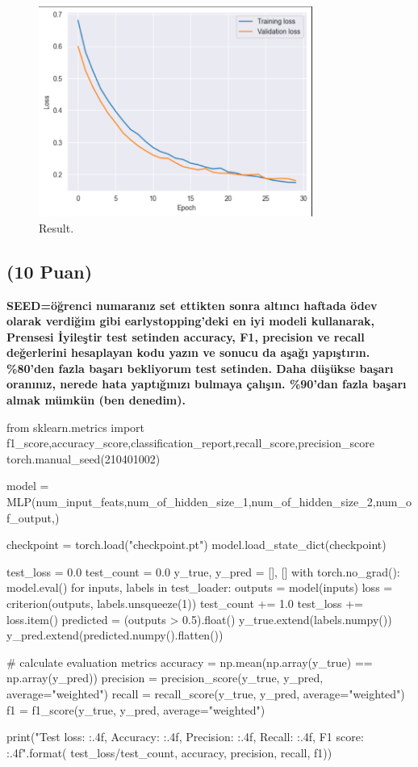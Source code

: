 \documentclass[11pt]{article}
\begin{document}
\begin{figure}[htbp]
  \centering
  \includegraphics[width=0.8\textwidth]{./result.png}
  \caption{Result.}
  \label{RESULT}
\end{figure}


\subsection{(10 Puan)} \textbf{SEED=öğrenci numaranız set ettikten sonra altıncı haftada ödev olarak verdiğim gibi earlystopping'deki en iyi modeli kullanarak, Prensesi İyileştir test setinden accuracy, F1, precision ve recall değerlerini hesaplayan kodu yazın ve sonucu da aşağı yapıştırın. \%80'den fazla başarı bekliyorum test setinden. Daha düşükse başarı oranınız, nerede hata yaptığınızı bulmaya çalışın. \%90'dan fazla başarı almak mümkün (ben denedim).}

\begin{python}
from sklearn.metrics import f1_score,accuracy_score,classification_report,recall_score,precision_score
torch.manual_seed(210401002)

model = MLP(num_input_feats,num_of_hidden_size_1,num_of_hidden_size_2,num_of_output,)

checkpoint = torch.load("checkpoint.pt")
model.load_state_dict(checkpoint)

test_loss = 0.0
test_count = 0.0
y_true, y_pred = [], []
with torch.no_grad():
    model.eval()
    for inputs, labels in test_loader:
        outputs = model(inputs)
        loss = criterion(outputs, labels.unsqueeze(1))
        test_count += 1.0
        test_loss += loss.item()
        predicted = (outputs > 0.5).float()
        y_true.extend(labels.numpy())
        y_pred.extend(predicted.numpy().flatten())

# calculate evaluation metrics
accuracy = np.mean(np.array(y_true) == np.array(y_pred))
precision = precision_score(y_true, y_pred, average="weighted")
recall = recall_score(y_true, y_pred, average="weighted")
f1 = f1_score(y_true, y_pred, average="weighted")

print("Test loss: {:.4f}, Accuracy: {:.4f}, Precision: {:.4f}, Recall: {:.4f}, F1 score: {:.4f}".format(
    test_loss/test_count, accuracy, precision, recall, f1))
\end{python}
\end{document}
